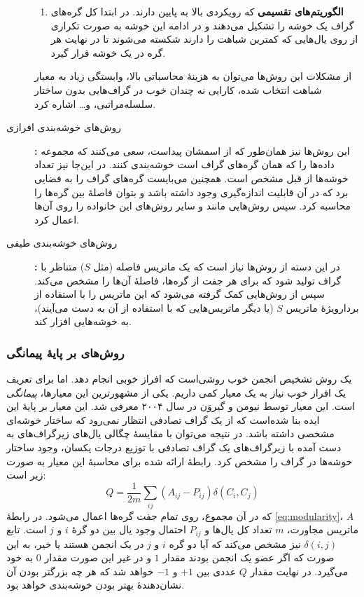 \begin{description}
\begin{enumerate}
    \item \textbf{الگوریتم‌های تقسیمی}
    که رویکردی بالا به پایین دارند. در ابتدا کل گره‌های گراف یک خوشه را تشکیل می‌دهند و در ادامه این خوشه به صورت تکراری از روی یال‌هایی که کمترین شباهت را دارند شکسته می‌شوند تا در نهایت هر گره در یک خوشه قرار گیرد.
  \end{enumerate}
  از مشکلات این روش‌ها می‌توان به هزینهٔ محاسباتی بالا، وابستگی زیاد به معیار شباهت انتخاب شده، کارایی نه چندان خوب در گراف‌هایی بدون ساختار سلسله‌مراتبی، و… اشاره کرد.
  \item[روش‌های خوشه‌بندی افرازی]\textbf{:}
  این روش‌ها نیز همان‌طور که از اسمشان پیداست، سعی می‌کنند که مجموعه داده‌ها را که همان گره‌های گراف است خوشه‌بندی کنند. در این‌جا نیز تعداد خوشه‌ها از قبل مشخص است. همچنین می‌بایست گره‌های گراف را به فضایی برد که در آن قابلیت اندازه‌گیری وجود داشته باشد و بتوان فاصلهٔ بین گره‌ها را محاسبه کرد. سپس روش‌هایی مانند  و سایر روش‌های این خانواده را روی آن‌ها اعمال کرد.
  \item[روش‌های خوشه‌بندی طیفی]\textbf{:}
  در این دسته از روش‌ها نیاز است که یک ماتریس فاصله (مثل $S$) متناظر با گراف تولید شود که برای هر جفت از گره‌ها، فاصلهٔ آن‌ها را مشخص می‌کند. سپس از روش‌هایی کمک گرفته می‌شود که این ماتریس را با استفاده از بردارویژهٔ ماتریس $S$ (یا دیگر ماتریس‌هایی که با استفاده از آن به دست می‌آیند)، به خوشه‌هایی افزار کند.
\end{description}

\subsubsection{روش‌های بر پایهٔ پیمانگی}
یک روش تشخیص انجمن خوب روشی‌است که افراز خوبی انجام دهد. اما برای تعریف یک افراز خوب نیاز به یک معیار کمی داریم. یکی از مشهورترین این معیارها، \textit{پیمانگی} است. این معیار توسط نیومن و گیروَن در سال ۲۰۰۴ معرفی شد\cite{newman2004finding}. این معیار بر پایهٔ این ایده بنا شده‌است که از یک گراف تصادفی انتظار نمی‌رود که ساختار خوشه‌ای مشخصی داشته باشد. در نتیجه می‌توان با مقایسهٔ چگالی یال‌های زیرگراف‌های به دست آمده با زیرگراف‌های یک گراف تصادفی با توزیع درجات یکسان، وجود ساختار خوشه‌ها در گراف را مشخص کرد. رابطهٔ ارائه شده برای محاسبهٔ این معیار به صورت زیر است:
\begin{equation}\label{eq:modularity}
  Q = \frac{1}{2m}\sum_{ij}{(A_{ij} - P_{ij})\delta(C_i,C_j)}
\end{equation}
که در آن مجموع، روی تمام جفت گره‌ها اعمال می‌شود. در رابطهٔ \ref{eq:modularity}، $A$ ماتریس مجاورت، $m$ تعداد کل یال‌ها و $P_{ij}$ احتمال وجود یال بین دو گرهٔ $i$ و $j$ است. تابع $\delta(i,j)$ نیز مشخص می‌کند که آیا دو گره $i$ و $j$ در یک انجمن هستند یا خیر، به این صورت که اگر عضو یک انجمن بودند مقدار $1$ و در غیر این صورت مقدار $0$ به خود می‌گیرد. در نهایت مقدار $Q$ عددی بین $+1$ و $-1$ خواهد شد که هر چه بزرگتر بودن آن نشان‌دهندهٔ بهتر بودن خوشه‌بندی خواهد بود.

